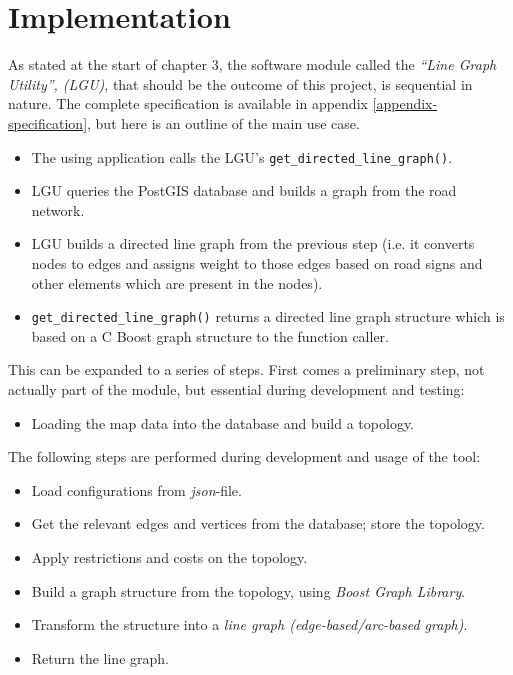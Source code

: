 \documentclass[../main.tex]{subfiles}
\begin{document}
\chapter{Implementation}
As stated at the start of chapter 3, the software module called the \textit{``Line Graph Utility'', (LGU)}, that should be the outcome of this project, is sequential in nature. The complete specification is available in appendix \ref{appendix-specification}, but here is an outline of the main use case.

\begin{itemize}
    \item The using application calls the LGU's \texttt{get\_directed\_line\_graph()}.
    \item LGU queries the PostGIS database and builds a graph from the road network.
    \item LGU builds a directed line graph from the previous step (i.e. it converts nodes to edges and assigns weight to those edges based on road signs and other elements which are present in the nodes).
    \item \texttt{get\_directed\_line\_graph()} returns a directed line graph structure which is based on a C Boost graph structure to the function caller.
\end{itemize}

\vspace{1em}
\noindent
This can be expanded to a series of steps. First comes a preliminary step, not actually part of the module, but essential during development and testing:

\begin{itemize}
    \item Loading the map data into the database and build a topology.
\end{itemize} 

\vspace{1em}
\noindent
The following steps are performed during development and usage of the tool:

\begin{itemize}
    \item Load configurations from \emph{json}-file.
    \item Get the relevant edges and vertices from the database; store the topology.
    \item Apply restrictions and costs on the topology.
    \item Build a graph structure from the topology, using \emph{Boost Graph Library}.
    \item Transform the structure into a \emph{line graph (edge-based/arc-based graph)}.
    \item Return the line graph.
\end{itemize}
\end{document}
